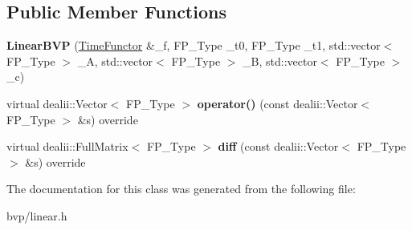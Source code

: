\subsection*{Public Member Functions}
\begin{DoxyCompactItemize}
\item 
\mbox{\label{classLinearBVP_a979b4eb350327c604269f13b8de5512f}} 
{\bfseries Linear\+B\+VP} (\hyperlink{classTimeFunctor}{Time\+Functor} \&\+\_\+f, F\+P\+\_\+\+Type \+\_\+t0, F\+P\+\_\+\+Type \+\_\+t1, std\+::vector$<$ F\+P\+\_\+\+Type $>$ \+\_\+A, std\+::vector$<$ F\+P\+\_\+\+Type $>$ \+\_\+B, std\+::vector$<$ F\+P\+\_\+\+Type $>$ \+\_\+c)
\item 
\mbox{\label{classLinearBVP_a93760b97372d67af212b5195e3cc9200}} 
virtual dealii\+::\+Vector$<$ F\+P\+\_\+\+Type $>$ {\bfseries operator()} (const dealii\+::\+Vector$<$ F\+P\+\_\+\+Type $>$ \&s) override
\item 
\mbox{\label{classLinearBVP_ae98d62d512526f375380b429a524c8fd}} 
virtual dealii\+::\+Full\+Matrix$<$ F\+P\+\_\+\+Type $>$ {\bfseries diff} (const dealii\+::\+Vector$<$ F\+P\+\_\+\+Type $>$ \&s) override
\end{DoxyCompactItemize}


The documentation for this class was generated from the following file\+:\begin{DoxyCompactItemize}
\item 
bvp/linear.\+h\end{DoxyCompactItemize}
